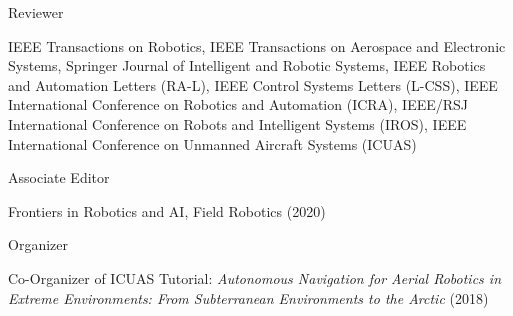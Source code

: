 

\begin{cvskills}

  \cvskill
    {Reviewer} %
	{\begin{minipage}[t]{\linewidth}\baselineskip
    		IEEE Transactions on Robotics, 
    		IEEE Transactions on Aerospace and Electronic Systems, 
    		Springer Journal of Intelligent and Robotic Systems, 
    		IEEE Robotics and Automation Letters (RA-L), 
    		IEEE Control Systems Letters (L-CSS), 
 		IEEE International Conference on Robotics and Automation (ICRA), 
 		IEEE/RSJ International Conference on Robots and Intelligent Systems (IROS), 
 		IEEE International Conference on Unmanned Aircraft Systems (ICUAS) \end{minipage}}
 \cvskill
    {Associate Editor} %
    {\begin{minipage}[t]{\linewidth}\baselineskip
    		Frontiers in Robotics and AI, Field Robotics (2020)\end{minipage}}
 \cvskill
 	{Organizer} %
    {\begin{minipage}[t]{\linewidth}\baselineskip
    		Co-Organizer of ICUAS Tutorial: \emph{Autonomous Navigation for Aerial Robotics in Extreme Environments: From Subterranean Environments to the Arctic} (2018)\end{minipage}}

\end{cvskills}
